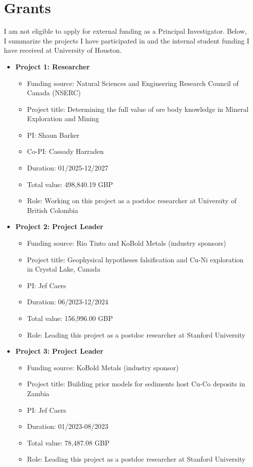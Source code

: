 \documentclass[11pt, a4paper]{article}
\begin{document}
\section*{Grants}
I am not eligible to apply for external funding as a Principal Investigator. Below, I summarize the projects I have participated in and the internal student funding I have received at University of Houston.

\begin{itemize}
	
	\item{\textbf{Project 1: Researcher}}
	\begin{itemize}
	\item Funding source: Natural Sciences and Engineering Research Council of Canada (NSERC)
	\item Project title: Determining the full value of ore body knowledge in Mineral Exploration and Mining
	\item PI: Shaun Barker
	\item Co-PI: Cassady Harraden
	\item Duration: 01/2025-12/2027
	\item Total value: 498,840.19 GBP
	\item Role: Working on this project as a postdoc researcher at University of British Colombia
	\end{itemize}

	\item{\textbf{Project 2: Project Leader}}
	\begin{itemize}
	\item Funding source: Rio Tinto and KoBold Metals (industry sponsors)
	\item Project title: Geophysical hypotheses falsification and Cu-Ni exploration in Crystal Lake, Canada
	\item PI: Jef Caers
	\item Duration: 06/2023-12/2024
	\item Total value: 156,996.00 GBP
	\item Role: Leading this project as a postdoc researcher at Stanford University
	\end{itemize}
	
	\item{\textbf{Project 3: Project Leader}}
	\begin{itemize}
	\item Funding source: KoBold Metals (industry sponsor)
	\item Project title: Building prior models for sediments host Cu-Co deposits in Zambia
	\item PI: Jef Caers
	\item Duration: 01/2023-08/2023
	\item Total value: 78,487.08 GBP
	\item Role: Leading this project as a postdoc researcher at Stanford University
	\end{itemize}
	

\end{itemize}
\end{document}
